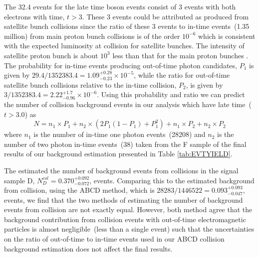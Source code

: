 \vspace{5mm}
The 32.4 events for the late time \PZ boson events consist of 3 \PZ events with both electrons with time, $t > 3$\ns. These 3 \PZ events could be attributed as produced from satellite bunch collisions since the ratio of these 3 events to in-time \PZ events~(1.35 million) from main proton bunch collisions is of the order $10^{-6}$ which is consistent with the expected luminosity at collision for satellite bunches. The intensity of satellite proton bunch is about $10^{3}$ less than that for the main proton bunches \cite{ATLAS-GHOST,CMS-GHOST}. 
\newline
The probability for in-time events producing out-of-time photon candidates, $P_{1}$ is given by $29.4/1352383.4 = 1.09^{+0.28}_{-0.23} \times 10^{-5}$, while the ratio for out-of-time satellite bunch collisions relative to the in-time collision, $P_{2}$, is given by $3/1352383.4 = 2.22^{+1.7}_{-0.96}\times 10^{-6}$. 
\newline
Using this probability and ratio we can predict the number of collision background events in our analysis which have late time~($t > 3.0$) as
\begin{equation}
  N = n_{1} \times P_{1} + n_{2} \times (2P_{1}(1 - P_{1}) + P_{1}^{2}) + n_{1} \times P_{2} + n_{2} \times P_{2}
\end{equation}
where $n_{1}$ is the number of in-time one photon events~(28208) and $n_{2}$ is the number of two photon in-time events~(38) taken from the \textsf{F} sample of the final results of our background estimation presented in Table \ref{tab:EVTYIELD}. 
\par
The estimated the number of background events from collisions in the signal sample \textsf{D}, $N^{col}_{D} = 0.370^{+0.092}_{-0.072}$, events. Comparing this to the estimated background from collision, using the \textsf{ABCD} method, which is $28283/1446522 = 0.093^{+0.093}_{-0.047}$, events, we find that the two methods of estimating the number of background events from collision are not exactly equal. 
However, both method agree that the background contribution from collision events with out-of-time electromagnetic particles is almost negligible~(less than a single event) such that the uncertainties on the ratio of out-of-time to in-time events used in our \textsf{ABCD} collision background estimation does not affect the final results.
